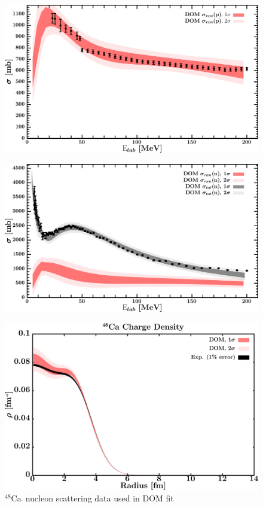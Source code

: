 \documentclass[twocolumn,secnumarabic,amssymb, nobibnotes, aps, prl,
superscriptaddress, nobalancelastpage, draft]{revtex4}
\newcommand{\caEight}{\ensuremath{^{48}}C\lowercase{a}}
\begin{document}
\begin{figure}[!htb]
\begin{minipage}{0.4\linewidth}
        \includegraphics[width=\linewidth]{figures/ca48_protonInelastic.png}
        \label{DOM_ca48_proton_inelastic}
    \end{minipage}\hspace{6pt}
    \begin{minipage}{0.4\linewidth}
        \centering
        \includegraphics[width=\linewidth]{figures/ca48_neutronInelastic.png}
        \label{DOM_ca48_neutron_inelastic}
    \end{minipage}
    \caption{\caEight\ nucleon scattering data used in DOM fit}
    \label{DOM_ca48_scattering}
    \centering
    \begin{minipage}{0.4\linewidth}
        \centering
        \includegraphics[width=\linewidth]{figures/ca48_chargeDensity.png}

\end{minipage}
\end{figure}
\end{document}
